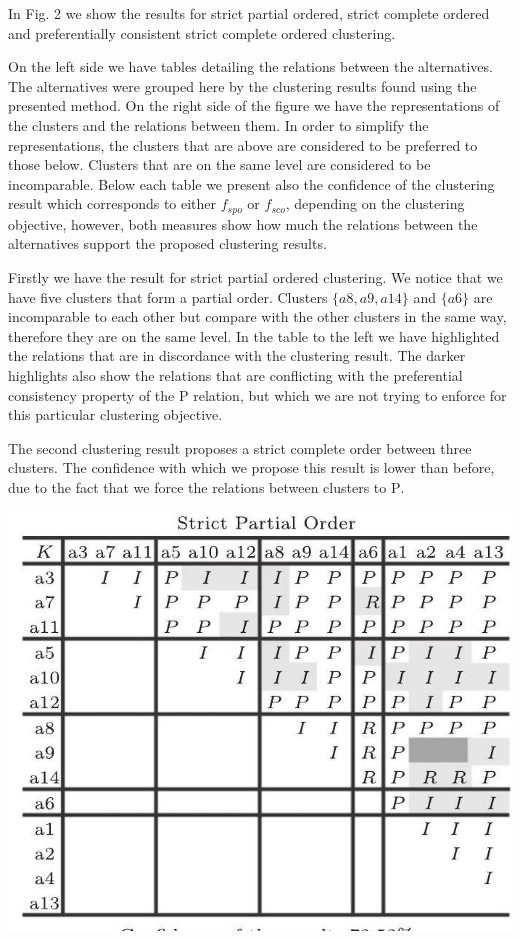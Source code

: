 \documentclass[10pt]{article}
\begin{document}
In Fig. 2 we show the results for strict partial ordered, strict complete ordered and preferentially consistent strict complete ordered clustering.

On the left side we have tables detailing the relations between the alternatives. The alternatives were grouped here by the clustering results found using the presented method. On the right side of the figure we have the representations of the clusters and the relations between them. In order to simplify the representations, the clusters that are above are considered to be preferred to those below. Clusters that are on the same level are considered to be incomparable. Below each table we present also the confidence of the clustering result which corresponds to either $f_{s p o}$ or $f_{s c o}$, depending on the clustering objective, however, both measures show how much the relations between the alternatives support the proposed clustering results.

Firstly we have the result for strict partial ordered clustering. We notice that we have five clusters that form a partial order. Clusters $\{a 8, a 9, a 14\}$ and $\{a 6\}$ are incomparable to each other but compare with the other clusters in the same way, therefore they are on the same level. In the table to the left we have highlighted the relations that are in discordance with the clustering result. The darker highlights also show the relations that are conflicting with the preferential consistency property of the $\mathrm{P}$ relation, but which we are not trying to enforce for this particular clustering objective.

The second clustering result proposes a strict complete order between three clusters. The confidence with which we propose this result is lower than before, due to the fact that we force the relations between clusters to $\mathrm{P}$.

\begin{center}
\includegraphics[max width=\textwidth]{2024_01_11_fda3c6ffd32dd805faacg-7(1)}
\end{center}
\end{document}
